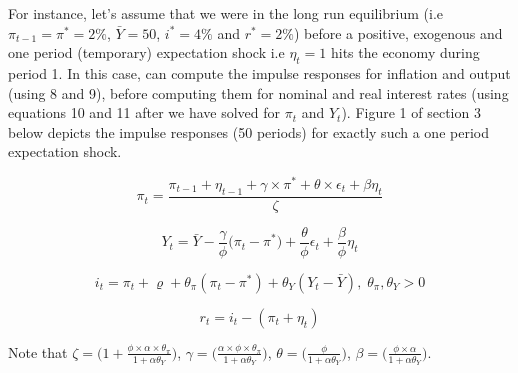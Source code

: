 \documentclass[12pt]{article}
\makeatletter
\newcommand\Taccount[3][3cm]%
{{\renewcommand\arraystretch{1.3}%
		\begin{adjustbox}{width=0.4\textwidth}
		\begin{tabular}[t]{@{}p{#1}|p{#1}@{}}
			\multicolumn{2}{@{}c@{}}{#2}\\
			\hline
			\hline
			#3
		\end{tabular}%
		\end{adjustbox}
	
}}
\newcommand{\1}{\mathbbm 1}
\renewcommand{\rho}{\varrho}
\makeatother
\begin{document}
For instance, let's assume that we were in the long run equilibrium (i.e $\pi_{t-1} = \pi^{*} = 2\%$, $\bar{Y} = 50$, $i^{*} = 4\%$ and $r^{*} = 2\%$) before a positive, exogenous and one period (temporary) expectation shock i.e $\eta_{t} = 1$ hits the economy during period 1. In this case, can compute the impulse responses for inflation and output (using 8 and 9), before computing them for nominal and real interest rates (using equations 10 and 11 after we have solved for $\pi_{t}$ and $Y_{t}$). Figure 1 of section 3 below depicts the impulse responses (50 periods) for exactly such a one period expectation shock.

\begin{equation}
	\pi_{t}  = \frac{\pi_{t-1} + \eta_{t-1} + \gamma \times \pi^{*} + \theta \times \epsilon_{t} +  \beta \eta_{t}}{\zeta}
\end{equation}

\begin{equation}
	Y_{t}  = \bar{Y} - \frac{\gamma}{\phi} \bigg(\pi_{t} - \pi^{*}\bigg) + \frac{\theta}{\phi} \epsilon_{t} + \frac{\beta}{\phi} \eta_{t}
\end{equation}


	

\begin{equation}
	i_{t} = \pi_{t} + \rho + \theta_{\pi} (\pi_{t} - \pi^{*}) + \theta_{Y} (Y_{t} - \bar{Y}), \; \theta_{\pi}, \theta_{Y} > 0
\end{equation}

\begin{equation}
	r_{t} = i_{t} - (\pi_{t} + \eta_{t})
\end{equation}

Note that $\zeta = \bigg(1 +  \frac{\phi \times \alpha \times \theta_{\pi}}{1 + \alpha \theta_{Y}}\bigg)$, $\gamma = \bigg(\frac{\alpha \times \phi \times \theta_{\pi}}{1 + \alpha \theta_{Y}}\bigg)$, $\theta = \bigg(\frac{\phi}{1 + \alpha \theta_{Y}}\bigg)$, $\beta = \bigg(\frac{\phi \times \alpha}{1 + \alpha \theta_{Y}}\bigg)$.














	
\end{document}
